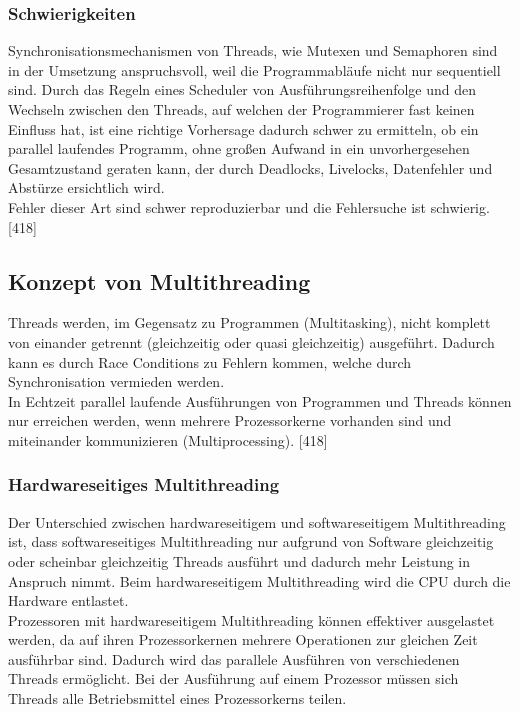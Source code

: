 \documentclass[12pt,a4paper]{report}
\begin{document}
\begin{onehalfspace}
\subsubsection{Schwierigkeiten}
Synchronisationsmechanismen von Threads, wie Mutexen und Semaphoren sind in der Umsetzung anspruchsvoll, weil die Programmabläufe nicht nur sequentiell sind. Durch das Regeln eines Scheduler von Ausführungsreihenfolge und den Wechseln zwischen den Threads, auf welchen der Programmierer fast keinen Einfluss hat, ist eine richtige Vorhersage dadurch schwer zu ermitteln, ob ein parallel laufendes Programm, ohne großen Aufwand in ein unvorhergesehen Gesamtzustand geraten kann, der durch Deadlocks, Livelocks, Datenfehler und Abstürze ersichtlich wird.\\
Fehler dieser Art sind schwer reproduzierbar und die Fehlersuche ist schwierig. [418]

\subsection{Konzept von Multithreading}
Threads werden, im Gegensatz zu Programmen (Multitasking), nicht komplett von einander getrennt (gleichzeitig oder quasi gleichzeitig) ausgeführt. Dadurch kann es durch Race Conditions zu Fehlern kommen, welche durch Synchronisation vermieden werden.\\ 
In Echtzeit parallel laufende Ausführungen von Programmen und Threads können nur erreichen werden, wenn mehrere Prozessorkerne vorhanden sind und miteinander kommunizieren (Multiprocessing). [418]

\subsubsection{Hardwareseitiges Multithreading}
Der Unterschied zwischen hardwareseitigem und softwareseitigem Multithreading ist, dass softwareseitiges Multithreading nur aufgrund von Software gleichzeitig oder scheinbar gleichzeitig Threads ausführt und dadurch mehr Leistung in Anspruch nimmt. Beim hardwareseitigem  Multithreading wird die CPU durch die Hardware entlastet.\\

Prozessoren mit hardwareseitigem Multithreading können effektiver ausgelastet werden, da auf ihren Prozessorkernen mehrere Operationen zur gleichen Zeit ausführbar sind. Dadurch wird das parallele Ausführen von verschiedenen Threads ermöglicht. Bei der Ausführung auf einem Prozessor müssen sich Threads alle Betriebsmittel eines Prozessorkerns teilen.\\


\end{onehalfspace}
\end{document}
